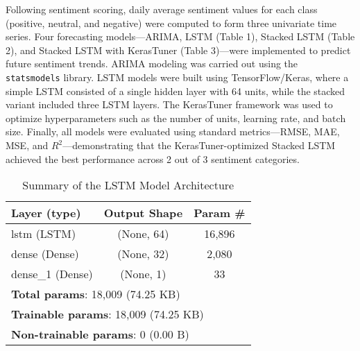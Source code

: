 \documentclass[letterpaper]{article}
\begin{document}
Following sentiment scoring, daily average sentiment values for each class (positive, neutral, and negative) were computed to form three univariate time series. Four forecasting models—ARIMA, LSTM (Table 1), Stacked LSTM (Table 2), and Stacked LSTM with KerasTuner (Table 3)—were implemented to predict future sentiment trends. ARIMA modeling was carried out using the \texttt{statsmodels} library. LSTM models were built using TensorFlow/Keras, where a simple LSTM consisted of a single hidden layer with 64 units, while the stacked variant included three LSTM layers. The KerasTuner framework was used to optimize hyperparameters such as the number of units, learning rate, and batch size. Finally, all models were evaluated using standard metrics—RMSE, MAE, MSE, and $R^2$—demonstrating that the KerasTuner-optimized Stacked LSTM achieved the best performance across 2 out of 3 sentiment categories.
\begin{table}[h]
\centering
\caption{Summary of the LSTM Model Architecture}
\begin{tabular}{lcc}
\toprule
\textbf{Layer (type)} & \textbf{Output Shape} & \textbf{Param \#} \\
\midrule
lstm (LSTM) & (None, 64) & 16,896 \\
dense (Dense) & (None, 32) & 2,080 \\
dense\_1 (Dense) & (None, 1) & 33 \\
\midrule
\multicolumn{3}{l}{\textbf{Total params}: 18,009 (74.25 KB)} \\
\multicolumn{3}{l}{\textbf{Trainable params}: 18,009 (74.25 KB)} \\
\multicolumn{3}{l}{\textbf{Non-trainable params}: 0 (0.00 B)} \\
\bottomrule
\end{tabular}
\label{tab:LSTM_arch}
\end{table}
\end{document}
